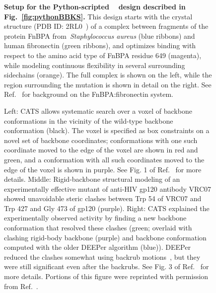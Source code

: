\begin{figure}
\caption{\textbf{Setup for the Python-scripted \bbks~\cite{BBK*} design described in Fig.~\ref{fig:pythonBBKS}.}  This design starts with the crystal structure (PDB ID: 2RL0~\cite{2RL0}) of a complex between fragments of the protein FnBPA from~\textit{Staphylococcus aureus} (blue ribbons) and human fibronectin (green ribbons), and optimizes binding with respect to the amino acid type of FnBPA residue 649 (magenta), while modeling continuous flexibility in several surrounding sidechains (orange).  The full complex is shown on the left, while the region surrounding the mutation is shown in detail on the right.  See Ref.~ for background on the FnBPA:fibronectin system.  }
\label{fig:pythonBBKSpic}
\end{figure}

\begin{figure}
\caption{Left: CATS allows systematic search over a voxel of backbone conformations in the vicinity of the wild-type backbone conformation (black).  The voxel is specified as box constraints on a novel set of backbone coordinates; conformations with one such coordinate moved to the edge of the voxel are shown in red and green, and a conformation with all such coordinates moved to the edge of the voxel is shown in purple.  See Fig. 1 of Ref.~ for more details.  Middle: Rigid-backbone structural modeling of an experimentally effective mutant of anti-HIV gp120 antibody VRC07 showed unavoidable steric clashes between Trp 54 of VRC07 and Trp 427 and Gly 473 of gp120 (purple).  Right: CATS explained the experimentally observed activity by finding a new backbone conformation that resolved these clashes (green; overlaid with clashing rigid-body backbone (purple) and backbone conformation computed with the older DEEPer algorithm (blue)).  DEEPer reduced the clashes somewhat using backrub motions~\cite{backrub}, but they were still significant even after the backrubs.  See Fig. 3 of Ref.~ for more details.   Portions of this figure were reprinted with permission from Ref.~.  }
\label{fig:cats}
\end{figure}


